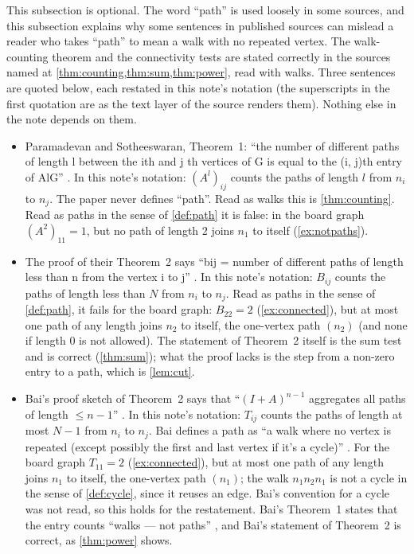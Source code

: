 This subsection is optional. The word ``path'' is used loosely in some
sources, and this subsection explains why some sentences in published
sources can mislead a reader who takes ``path'' to mean a walk with no
repeated vertex. The walk-counting theorem and the connectivity tests are
stated correctly in the sources named at
\cref{thm:counting,thm:sum,thm:power}, read with walks. Three sentences are
quoted below, each restated in this note's notation (the superscripts in
the first quotation are as the text layer of the source renders them). Nothing
else in the note depends on them.
\begin{itemize}
\item Paramadevan and Sotheeswaran, Theorem~1: ``the number of different
  paths of length l between the ith and j th vertices of G is equal to the
  (i, j)th entry of AlG'' \cite[p.~16]{paramadevan2021adjacency}. In this
  note's notation: $(A^l)_{ij}$ counts the paths of length $l$ from $n_i$
  to $n_j$. The paper never defines ``path''. Read as walks this is
  \cref{thm:counting}. Read as paths in the sense of \cref{def:path} it is
  false: in the board graph $(A^2)_{11}=1$, but no path of length $2$ joins
  $n_1$ to itself (\cref{ex:notpaths}).
\item The proof of their Theorem~2 says ``bij = number of different paths
  of length less than n from the vertex i to j''
  \cite[p.~17]{paramadevan2021adjacency}. In this note's notation: $B_{ij}$
  counts the paths of length less than $N$ from $n_i$ to $n_j$. Read as
  paths in the sense of \cref{def:path}, it fails for the board graph:
  $B_{22}=2$ (\cref{ex:connected}), but at most one path of any length
  joins $n_2$ to itself, the one-vertex path $(n_2)$ (and none if length $0$
  is not allowed). The statement of Theorem~2 itself is the sum test and is
  correct (\cref{thm:sum}); what the proof lacks is the step from a
  non-zero entry to a path, which is \cref{lem:cut}.
\item Bai's proof sketch of Theorem~2 says that ``$(I+A)^{n-1}$ aggregates
  all paths of length $\le n-1$'' \cite[p.~2]{bai2025adjacency}. In this
  note's notation: $T_{ij}$ counts the paths of length at most $N-1$ from
  $n_i$ to $n_j$. Bai defines a path as ``a walk where no vertex is
  repeated (except possibly the first and last vertex if it's a cycle)''
  \cite[p.~1]{bai2025adjacency}. For the board graph $T_{11}=2$
  (\cref{ex:connected}), but at most one path of any length joins $n_1$ to
  itself, the one-vertex path $(n_1)$; the walk $n_1n_2n_1$ is not a cycle
  in the sense of \cref{def:cycle}, since it reuses an edge. Bai's convention for a cycle was not read, so this holds for the
  restatement. Bai's Theorem~1 states
  that the entry counts ``walks --- not paths'' \cite[p.~1]{bai2025adjacency},
  and Bai's statement of Theorem~2 is correct, as \cref{thm:power} shows.
\end{itemize}

